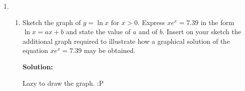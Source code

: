 \documentclass{report}
\newcommand{\sol}{\vspace{0.2cm}\textbf{Solution:}\vspace{0.2cm}}
\begin{document}
\begin{multicols*}{2}
\begin{enumerate}[leftmargin=*]
\begin{enumerate}
                        \sol{}
                        \begin{align*}
                            \log_b (x^3 y) & = p              \\
                            \log_b (y)     & = p - 3 \log_b x
                        \end{align*}
                        \begin{align*}
                            \log_b \left(\dfrac{y}{x^2}\right) & = q                \\
                            \log_b (y) - 2 \log_b x            & = q                \\
                            \log_b (y)                         & = q + 2 \log_b x   \\
                            p - 3 \log_b x                     & = q + 2 \log_b x   \\
                            p                                  & = 5 \log_b x + q   \\
                            \log_b x                           & = \dfrac{p - q}{5}
                        \end{align*}
                        \begin{align*}
                            \log_b (xy) & = \log_b x + \log_b y                             \\
                                        & = \dfrac{p - q}{5} + p - 3 \cdot \dfrac{p - q}{5} \\
                                        & = \dfrac{-2p+2q}{5} + p                           \\
                                        & = \dfrac{3p + 2q}{5}
                        \end{align*}
              \end{enumerate}

        \item \begin{enumerate}
                  \item Sketch the graph of $y=\ln x$ for $x>0$. Express $xe^{x}=7.39$ in the form $\ln
                            x=a x+b$ and state the value of $a$ and of $b$. Insert on your sketch the
                        additional graph required to illustrate how a graphical solution of the
                        equation $xe^{x}=7.39$ may be obtained.

                        \sol{}

                        Lazy to draw the graph. :P


\end{enumerate}
\end{enumerate}
\end{multicols*}
\end{document}
